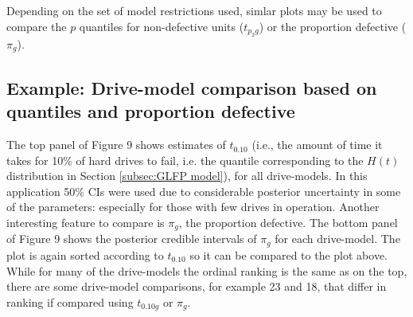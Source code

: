 \documentclass[12pt]{article}
\begin{document}
Depending on the set of model restrictions used, simlar plots may be used to compare the $p$ quantiles for non-defective units ($t_{p_{2}g}$) or the proportion defective ($\pi_g$).

\subsection{Example: Drive-model comparison based on quantiles and proportion defective}
The top panel of Figure 9 shows estimates of $t_{0.10}$ (i.e., the amount of time it takes for 10\% of hard drives to fail, i.e. the quantile corresponding to the $H(t)$ distribution in Section \ref{subsec:GLFP model}), for all drive-models.  In this application 50\% CIs were used due to considerable posterior uncertainty in some of the parameters: especially for those with few drives in operation.  %
Another interesting feature to compare is $\pi_g$, the proportion defective.  The bottom panel of Figure 9 shows the posterior credible intervals of $\pi_g$ for each drive-model.  The plot is again sorted according to $t_{0.10}$ so it can be compared to the plot above.  While for many of the drive-models the ordinal ranking is the same as on the top, there are some drive-model comparisons, for example 23 and 18, that differ in ranking if compared using $t_{0.10g}$ or $\pi_g$.
\end{document}
